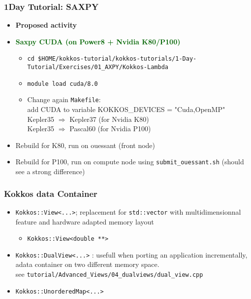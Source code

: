 \begin{frame}[fragile=singleslide]
  \frametitle{1Day Tutorial: SAXPY}

  \begin{itemize}
  \item \textbf{Proposed activity}
  \item \textcolor{darkgreen}{\textbf{Saxpy CUDA (on Power8 + Nvidia K80/P100)}}
    \begin{itemize}
    \item \texttt{cd \$HOME/kokkos-tutorial/kokkos-tutorials/1-Day-Tutorial/Exercises/01\_AXPY/Kokkos-Lambda}
    \item \texttt{module load cuda/8.0}
    \item Change again \texttt{Makefile}: \\
      add CUDA to variable KOKKOS\_DEVICES = "Cuda,OpenMP"\\
      Kepler35 $\Rightarrow$ Kepler37 (for Nvidia K80)\\
      Kepler35 $\Rightarrow$ Pascal60 (for Nvidia P100)
    \end{itemize}
  \item Rebuild for K80, run on ouessant (front node)
  \item Rebuild for P100, run on compute node using \texttt{submit\_ouessant.sh} (should see a strong difference)
  \end{itemize}

\end{frame}


\begin{frame}[fragile=singleslide]
  \frametitle{Kokkos data Container}

  \begin{itemize}
  \item \texttt{Kokkos::View<...>}; replacement for \texttt{std::vector} with multidimensionnal feature and hardware adapted memory layout\\
    \begin{itemize}
    \item \texttt{Kokkos::View<double **>}
    \end{itemize}

  \item \texttt{Kokkos::DualView<...>} : usefull when porting an application incrementally, adata container on two different memory space.\\
    see \texttt{tutorial/Advanced\_Views/04\_dualviews/dual\_view.cpp}
  \item \texttt{Kokkos::UnorderedMap<...>}
  \end{itemize}

\end{frame}


